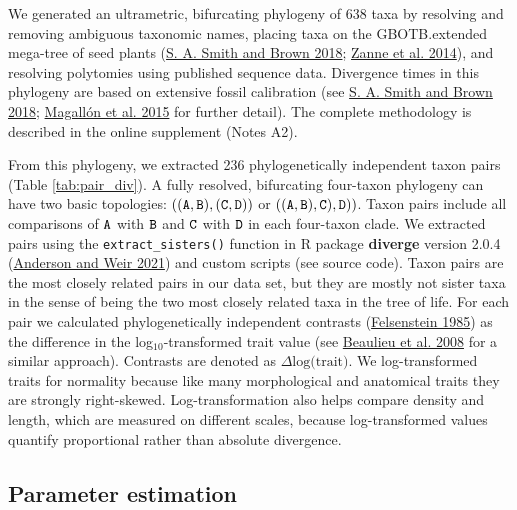 \documentclass[
  12pt,
]{article}
\begin{document}
We generated an ultrametric, bifurcating phylogeny of 638 taxa by resolving and removing ambiguous taxonomic names, placing taxa on the GBOTB.extended mega-tree of seed plants (\protect\hyperlink{ref-smith_constructing_2018}{S. A. Smith and Brown 2018}; \protect\hyperlink{ref-zanne_three_2014}{Zanne et al. 2014}), and resolving polytomies using published sequence data. Divergence times in this phylogeny are based on extensive fossil calibration (see \protect\hyperlink{ref-smith_constructing_2018}{S. A. Smith and Brown 2018}; \protect\hyperlink{ref-magallon_metacalibrated_2015}{Magallón et al. 2015} for further detail). The complete methodology is described in the online supplement (Notes A2).

From this phylogeny, we extracted 236 phylogenetically independent taxon pairs (Table \ref{tab:pair_div}). A fully resolved, bifurcating four-taxon phylogeny can have two basic topologies: \(\tt{((A,B),(C,D))}\) or \(\tt{((A,B),C),D))}\). Taxon pairs include all comparisons of \(\tt{A}\) with \(\tt{B}\) and \(\tt{C}\) with \(\tt{D}\) in each four-taxon clade. We extracted pairs using the \texttt{extract\_sisters()} function in R package \textbf{diverge} version 2.0.4 (\protect\hyperlink{ref-anderson_diverge_2021}{Anderson and Weir 2021}) and custom scripts (see source code). Taxon pairs are the most closely related pairs in our data set, but they are mostly not sister taxa in the sense of being the two most closely related taxa in the tree of life. For each pair we calculated phylogenetically independent contrasts (\protect\hyperlink{ref-felsenstein_phylogenies_1985}{Felsenstein 1985}) as the difference in the log\(_{10}\)-transformed trait value (see \protect\hyperlink{ref-beaulieu_genome_2008}{Beaulieu et al. 2008} for a similar approach). Contrasts are denoted as \(\Delta \text{log(trait)}\). We log-transformed traits for normality because like many morphological and anatomical traits they are strongly right-skewed. Log-transformation also helps compare density and length, which are measured on different scales, because log-transformed values quantify proportional rather than absolute divergence.

\hypertarget{parameter-estimation}{%
\subsection{Parameter estimation}\label{parameter-estimation}}
\end{document}
